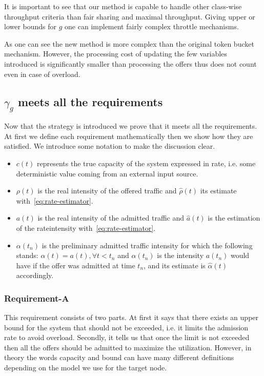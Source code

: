 \documentclass[conference]{IEEEtran}
\begin{document}
It is important to see that our method is capable to handle other
class-wise throughput criteria than fair sharing and maximal
throughput. Giving upper or lower bounds for $g$ one can implement
fairly complex throttle mechanisms.

As one can see the new method is more complex than the original
token bucket mechanism. However, the processing cost of updating the
few variables introduced is significantly smaller than processing
the offers thus does not count even in case of overload.

\subsection{$\gamma_g$ meets all the
requirements}\label{section:g-meets-the-requirements} Now that the
strategy is introduced we prove that it meets all the requirements.
At first we define each requirement mathematically then we show how
they are satisfied. We introduce some notation to make the
discussion clear.
\begin{itemize}
 \item $c(t)$ represents the true capacity of the system expressed in rate, i.e. some
 deterministic value coming from an external input source.
 \item $\rho(t)$ is the real intensity of the offered traffic and $\hat{\rho}(t)$ its
 estimate with~\eqref{eq:rate-estimator}.
 \item $a(t)$ is the real intensity of the admitted traffic and
 $\hat{a}(t)$ is the estimation of the rateintensity with~\eqref{eq:rate-estimator}.
 \item $\alpha(t_n)$ is the preliminary admitted traffic intensity for which
 the following stands: $\alpha(t)=a(t),\forall t<t_n$ and
 $\alpha(t_n)$ is the intensity $a(t_n)$ would have if the offer was
 admitted at time $t_n$, and its estimate is $\hat{\alpha}(t)$
 accordingly.
\end{itemize}

\subsubsection{Requirement-A\ }
This requirement consists of two parts. At first it says that there
exists an upper bound for the system that should not be exceeded,
i.e. it limits the admission rate to avoid overload. Secondly, it
tells us that once the limit is not exceeded then all the offers
should be admitted to maximize the utilization. However, in theory
the words capacity and bound can have many different definitions
depending on the model we use for the target node.
\end{document}
